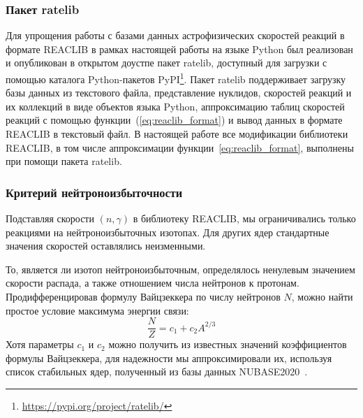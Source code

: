 \subsubsection{Пакет ratelib}
Для упрощения работы с базами данных астрофизических скоростей реакций в формате REACLIB в рамках настоящей работы на языке Python был реализован и опубликован в открытом доустпе пакет ratelib, доступный для загрузки с помощью каталога Python-пакетов PyPI\footnote{\href{https://pypi.org/project/ratelib/}{https://pypi.org/project/ratelib/}}. Пакет ratelib поддерживает загрузку базы данных из текстового файла, представление нуклидов, скоростей реакций и их коллекций в виде объектов языка Python, аппроксимацию таблиц скоростей реакций с помощью функции~(\ref{eq:reaclib_format}) и вывод данных в формате REACLIB в текстовый файл. В настоящей работе все модификации библиотеки REACLIB, в том числе аппроксимации функции~\ref{eq:reaclib_format}, выполнены при помощи пакета ratelib.

\subsubsection{Критерий нейтроноизбыточности} \label{sec:nrich_criteria}
Подставляя скорости $(n,\gamma)$ в библиотеку REACLIB, мы ограничивались только реакциями на нейтроноизбыточных изотопах. Для других ядер стандартные значения скоростей оставлялись неизменными.

То, является ли изотоп нейтроноизбыточным, определялось ненулевым значением скорости распада, а также отношением числа нейтронов к протонам. Продифференцировав формулу Вайцзеккера по числу нейтронов $N$, можно найти простое условие максимума энергии связи:
\begin{equation}
  \displaystyle
  \frac{N}{Z} = c_1 + c_2 A^{2/3}
  \label{eq:nzratio}
\end{equation}
Хотя параметры $c_1$ и $c_2$ можно получить из известных значений коэффициентов формулы Вайцзеккера, для надежности мы аппроксимировали их, используя список стабильных ядер, полученный из базы данных NUBASE2020~\cite{kondev2021}.
